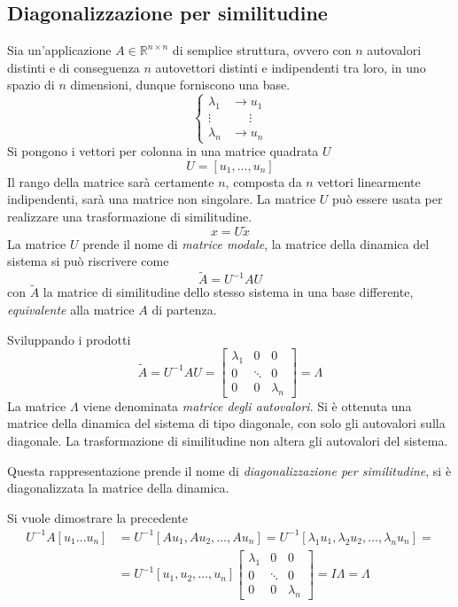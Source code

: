 
\subsection{Diagonalizzazione per similitudine}
Sia un'applicazione $A\in\mathbb{R}^{n\times n}$ di semplice struttura, ovvero
con $n$ autovalori distinti e di conseguenza $n$ autovettori distinti e
indipendenti tra loro, in uno spazio di $n$ dimensioni, dunque forniscono una
base.
$$
\left\{\begin{aligned}
\lambda_1& \rightarrow u_1\\
\vdots& \quad\ \  \vdots \\
\lambda_n & \rightarrow u_n
\end{aligned}\right.
$$
Si pongono i vettori per colonna in una matrice quadrata $U$
$$
U = [u_1, \ldots, u_n]
$$
Il rango della matrice sarà certamente $n$, composta da $n$ vettori linearmente
indipendenti, sarà una matrice non singolare.
La matrice $U$ può essere usata per realizzare una trasformazione di
similitudine.
$$
x = U\tilde{x}
$$
La matrice $U$ prende il nome di \textit{matrice modale},
la matrice della dinamica del sistema si può riscrivere come
$$
\tilde{A} = U^{-1}AU
$$
con $\tilde{A}$ la matrice di similitudine dello stesso sistema in una base
differente, \textit{equivalente} alla matrice $A$ di partenza.

Sviluppando i prodotti
$$
\tilde{A} = U^{-1}AU = \begin{bmatrix}
                        \lambda_1 & 0 & 0 \\
                        0 & \ddots & 0 \\
                        0 & 0 & \lambda_n
                        \end{bmatrix} = \Lambda
$$
La matrice $\Lambda$ viene denominata \textit{matrice degli autovalori}.
Si è ottenuta una matrice della dinamica del sistema di tipo diagonale, con
solo gli autovalori sulla diagonale.
La trasformazione di similitudine non altera gli autovalori del sistema.

Questa rappresentazione prende il nome di \textit{diagonalizzazione per
similitudine}, si è diagonalizzata la matrice della dinamica.

Si vuole dimostrare la precedente
$$\begin{aligned}
U^{-1} A[u_1 \ldots u_n] &= U^{-1} [Au_1, Au_2, \ldots, Au_n] =
U^{-1}[\lambda_1u_1,\lambda_2u_2,\ldots,\lambda_nu_n] =\\
&=U^{-1} [u_1,u_2,\ldots,u_n] \begin{bmatrix}
                        \lambda_1 & 0 & 0 \\
                        0 & \ddots & 0 \\
                        0 & 0 & \lambda_n
                             \end{bmatrix} = I\Lambda = \Lambda
\end{aligned}$$

